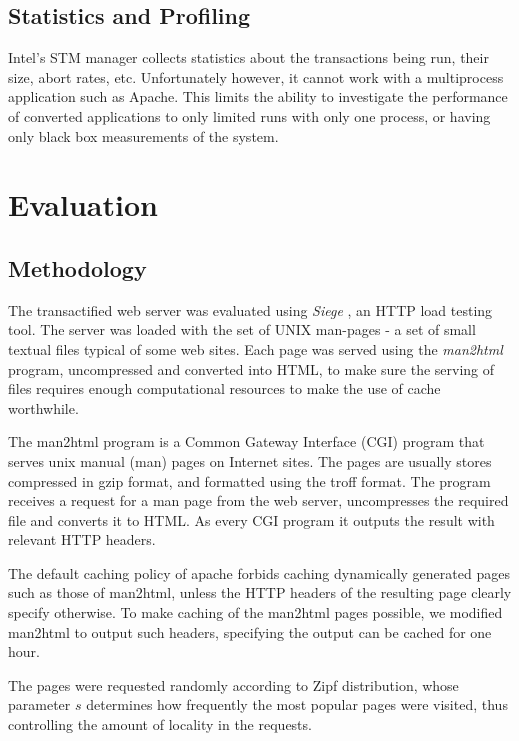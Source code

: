 \documentclass[preprint,11pt]{sigplanconf}
\let \cite = \citep
\begin{document}

\subsection{Statistics and Profiling}\label{sec:wishlist-statistics}
Intel's STM manager collects statistics about the transactions being run, their
size, abort rates, etc. Unfortunately however, it cannot work with a
multiprocess application such as Apache. This limits the ability to investigate
the performance of converted applications to only limited runs with only one
process, or having only black box measurements of the system.

\section{Evaluation}\label{sec:evaluation}
\subsection{Methodology} 
The transactified web server was evaluated using \emph{Siege} \cite{siege}, an
HTTP load testing tool. The server was loaded with the set of UNIX man-pages - a
set of small textual files typical of some web sites. Each page was served using
the \emph{man2html} program, uncompressed and converted into HTML, to make sure
the serving of files requires enough computational resources to make the use of
cache worthwhile.

The man2html program is a Common Gateway Interface (CGI) program that serves
unix manual (man) pages on Internet sites. The pages are usually stores
compressed in gzip format, and formatted using the troff format. The program
receives a request for a man page from the web server, uncompresses the required
file and converts it to HTML. As every CGI program it outputs the result with
relevant HTTP headers.

The default caching policy of apache forbids caching dynamically generated pages
such as those of man2html, unless the HTTP headers of the resulting page clearly
specify otherwise. To make caching of the man2html pages possible, we modified
man2html to output such headers, specifying the output can be cached for one
hour.

The pages were requested randomly according to Zipf distribution, whose
parameter $s$ determines how frequently the most popular pages were visited,
thus controlling the amount of locality in the requests.
\end{document}
